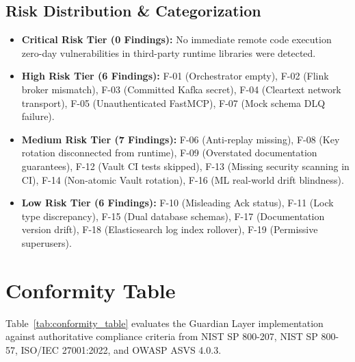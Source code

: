 \documentclass[10pt,a4paper]{report}
\begin{document}
\section{Risk Distribution \& Categorization}
\begin{itemize}[leftmargin=*]
  \item \textbf{Critical Risk Tier (0 Findings):} No immediate remote code execution zero-day vulnerabilities in third-party runtime libraries were detected.
  \item \textbf{High Risk Tier (6 Findings):} F-01 (Orchestrator empty), F-02 (Flink broker mismatch), F-03 (Committed Kafka secret), F-04 (Cleartext network transport), F-05 (Unauthenticated FastMCP), F-07 (Mock schema DLQ failure).
  \item \textbf{Medium Risk Tier (7 Findings):} F-06 (Anti-replay missing), F-08 (Key rotation disconnected from runtime), F-09 (Overstated documentation guarantees), F-12 (Vault CI tests skipped), F-13 (Missing security scanning in CI), F-14 (Non-atomic Vault rotation), F-16 (ML real-world drift blindness).
  \item \textbf{Low Risk Tier (6 Findings):} F-10 (Misleading Ack status), F-11 (Lock type discrepancy), F-15 (Dual database schemas), F-17 (Documentation version drift), F-18 (Elasticsearch log index rollover), F-19 (Permissive superusers).
\end{itemize}

\chapter{Conformity Table}

Table~\ref{tab:conformity_table} evaluates the Guardian Layer implementation against authoritative compliance criteria from NIST SP 800-207, NIST SP 800-57, ISO/IEC 27001:2022, and OWASP ASVS 4.0.3.
\end{document}
